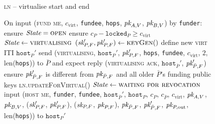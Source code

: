 \begin{figure}[H]
  \begin{processbox}{\textsc{ln} -- virtualise start and end}
    \begin{algorithmic}[1]
      \State On input (\textsc{fund me}, $c_{\mathrm{virt}}$, \texttt{fundee},
      \texttt{hops}, $\textit{pk}_{A, V}$, $\textit{pk}_{B, V}$) by \texttt{funder}:
      \Indent
        \State ensure $\itistate = \textsc{open}$
        \State ensure $c_P - \texttt{locked}_P \geq c_{\mathrm{virt}}$
        \State $\itistate \gets \textsc{virtualising}$
        \State $(\textit{sk}_{P, F}', \textit{pk}_{P, F}') \gets \textsc{keyGen}()$
        \State define new \textsc{virt} ITI $\texttt{host}_P'$
        \label{code:ln:virtualise:start-end:define}
        \State send (\textsc{virtualising}, $\texttt{host}_P'$, $\textit{pk}_{P, F}'$,
        \texttt{hops}, \texttt{fundee}, $c_{\mathrm{virt}}$, $2$,
        len(\texttt{hops})) to $\bar{P}$ and expect reply (\textsc{virtualising
        ack}, $\texttt{host}_{\bar{P}}'$, $\textit{pk}_{\bar{P}, F}'$)
        \State ensure $\textit{pk}_{\bar{P}, F}'$ is different from $\textit{pk}_{\bar{P}, F}$ and
        all older $\bar{P}$'s funding public keys
        \State \textsc{ln}.\textsc{updateForVirtual}()
        \label{code:ln:virtualise:start-end:virtual-update}
        \State $\itistate \gets \textsc{waiting for revocation}$
        \State input (\textsc{host me}, \texttt{funder}, \texttt{fundee},
        $\texttt{host}_{\bar{P}}'$, $\texttt{host}_P$, $c_P$, $c_{\bar{P}}$,
        $c_{\mathrm{virt}}$, $\textit{pk}_{A, V}$, $\textit{pk}_{B, V}$, ($\textit{sk}_{P, F}'$, $\textit{pk}_{P,
        F}'$), ($\textit{sk}_{P, F}$, $\textit{pk}_{P, F}$), $\textit{pk}_{\bar{P}, F}$, $\textit{pk}_{\bar{P},
        F}'$, $\textit{pk}_{P, \mathrm{out}}$, len(\texttt{hops})) to $\texttt{host}_P'$
        \label{code:ln:virtualise:start-end:host-me}
      \EndIndent
      \Statex


\end{algorithmic}
\end{processbox}
\end{figure}
